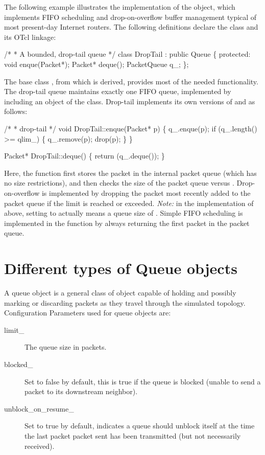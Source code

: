 The following example illustrates the implementation of the
 object,
which implements FIFO scheduling and
drop-on-overflow buffer management typical of most present-day
Internet routers.
The following definitions declare the class and its OTcl linkage:
\begin{program}
        /*
         * {\cf A bounded, drop-tail queue}
         */
        class DropTail : public Queue \{
         protected:
                void enque(Packet*);
                Packet* deque();
                PacketQueue q_;
        \};
\end{program}
The base class ,
from which  is derived, provides most
of the needed functionality.
The drop-tail queue maintains exactly one FIFO queue, implemented
by including an object of the  class.
Drop-tail implements its own versions of  and 
as follows:
\begin{program}
        /*
         * {\cf drop-tail}
         */
        void DropTail::enque(Packet* p)
        \{
                q_.enque(p);
                if (q_.length() >= qlim_) \{
                        q_.remove(p);
                        drop(p);
                \}
        \}

        Packet* DropTail::deque()
        \{
                return (q_.deque());
        \}
\end{program}
Here, the  function first stores the packet in the
internal packet queue (which has no size restrictions), and then
checks the size of the packet queue versus .
Drop-on-overflow is implemented by dropping the packet most recently
added to the packet queue if the limit is reached or exceeded.
\emph{Note:} in the implementation of  above, 
 setting  to  actually means a queue size of .
Simple FIFO scheduling is implemented in the  function
by always returning the first packet in the packet queue.


\section{Different types of Queue objects}
\label{sec:queueobjects}
A queue object is a general class of object capable of holding and
possibly marking or discarding packets as they travel through the
simulated topology. Configuration Parameters used for queue objects are:
\begin{description}
\item[limit\_] The queue size in packets. 

\item[blocked\_] Set to false by default, this is true if the queue is
blocked (unable to send a packet to its downstream neighbor). 

\item[unblock\_on\_resume\_] Set to true by default, indicates a queue
should unblock itself at the time the last packet packet sent has been
transmitted (but not necessarily received). 
\end{description}

